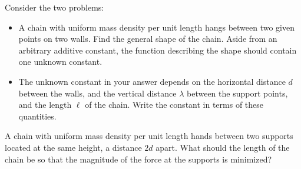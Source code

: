 \documentclass[11pt]{scrartcl}
\begin{document}
\begin{example}
  Consider the two problems:
  \begin{itemize}
    \item A chain with uniform mass density per unit length hangs
      between two given points on two walls. Find the general shape of the
      chain. Aside from an arbitrary additive constant, the function
      describing the shape should contain one unknown constant.
    \item The unknown constant in your answer depends on the horizontal
      distance $d$ between the walls, and the vertical distance $\lambda$
      between the support points, and the length $\ell$ of the chain. Write
      the constant in terms of these quantities.
  \end{itemize}
\end{example}
\begin{soln}
\end{soln}
\begin{example}
  A chain with uniform mass density per unit length hands between two supports located
  at the same height, a distance $2d$ apart. What should the length of the chain be so that
  the magnitude of the force at the supports is minimized?
\end{example}
\begin{soln}
\end{soln}
\newpage
\end{document}

